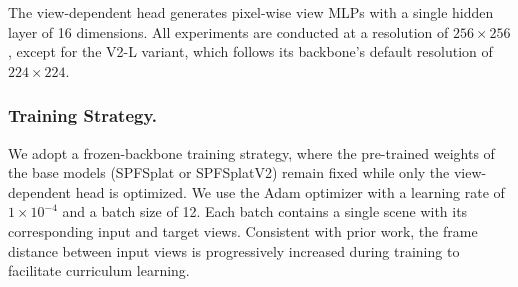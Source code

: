 \documentclass[runningheads]{llncs}
\begin{document}
The view-dependent head generates pixel-wise view MLPs with a single hidden layer of 16 dimensions. All experiments are conducted at a resolution of $256 \times 256$, except for the V2-L variant, which follows its backbone's default resolution of $224 \times 224$.

\vspace{-0.4cm}
\subsubsection{Training Strategy.}
We adopt a frozen-backbone training strategy, where the pre-trained weights of the base models (SPFSplat or SPFSplatV2) remain fixed while only the view-dependent head is optimized. We use the Adam optimizer with a learning rate of $1 \times 10^{-4}$ and a batch size of 12. Each batch contains a single scene with its corresponding input and target views. Consistent with prior work, the frame distance between input views is progressively increased during training to facilitate curriculum learning.
\end{document}
